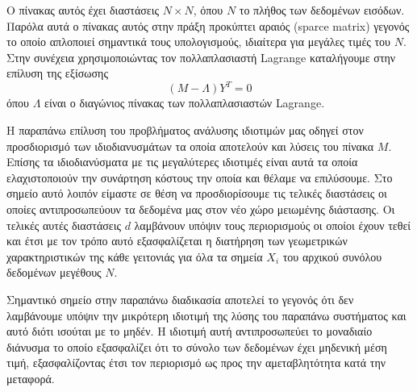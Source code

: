 Ο πίνακας αυτός έχει διαστάσεις $N \times N$, όπου $N$ το πλήθος των δεδομένων εισόδων. Παρόλα αυτά ο πίνακας αυτός στην πράξη προκύπτει αραιός \textlatin{(sparce matrix)} γεγονός το οποίο απλοποιεί σημαντικά τους υπολογισμούς, ιδιαίτερα για μεγάλες τιμές του $N$. Στην συνέχεια χρησιμοποιώντας τον πολλαπλασιαστή \textlatin{Lagrange} καταλήγουμε στην επίλυση της εξίσωσης
\begin{equation}
        (M-\Lambda)Y^{T} = 0
\end{equation}
\hspace*{\fill}\newline
όπου $\Lambda$ είναι ο διαγώνιος πίνακας των πολλαπλασιαστών \textlatin{Lagrange}. 
\par
Η παραπάνω επίλυση του προβλήματος ανάλυσης ιδιοτιμών μας οδηγεί στον προσδιορισμό των ιδιοδιανυσμάτων τα οποία αποτελούν και λύσεις του πίνακα $M$. Επίσης τα ιδιοδιανύσματα με τις μεγαλύτερες ιδιοτιμές είναι αυτά τα οποία ελαχιστοποιούν την συνάρτηση κόστους την οποία και θέλαμε να επιλύσουμε. Στο σημείο αυτό λοιπόν είμαστε σε θέση να προσδιορίσουμε τις τελικές διαστάσεις οι οποίες αντιπροσωπεύουν τα δεδομένα μας στον νέο χώρο μειωμένης διάστασης. Οι τελικές αυτές διαστάσεις $d$ λαμβάνουν υπόψιν τους περιορισμούς οι οποίοι έχουν τεθεί και έτσι με τον τρόπο αυτό εξασφαλίζεται η διατήρηση των γεωμετρικών χαρακτηριστικών της κάθε γειτονιάς για όλα τα σημεία $X_{i}$ του αρχικού συνόλου δεδομένων μεγέθους $N$. 
\par
Σημαντικό σημείο στην παραπάνω διαδικασία αποτελεί το γεγονός ότι δεν λαμβάνουμε υπόψιν την μικρότερη ιδιοτιμή της λύσης του παραπάνω συστήματος και αυτό διότι ισούται με το μηδέν. Η ιδιοτιμή αυτή αντιπροσωπεύει το μοναδιαίο διάνυσμα το οποίο εξασφαλίζει ότι το σύνολο των δεδομένων έχει μηδενική μέση τιμή, εξασφαλίζοντας έτσι τον περιορισμό ως προς την αμεταβλητότητα κατά την μεταφορά.
\par
